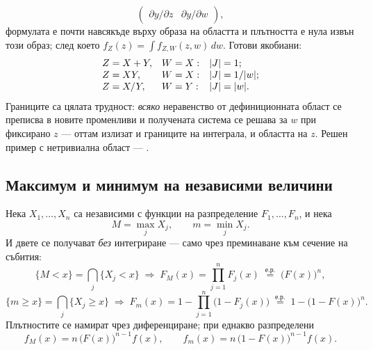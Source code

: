 \begin{itemize}
\[\begin{pmatrix}
             \partial y/\partial z & \partial y/\partial w
           \end{pmatrix}, \]
        формулата е почти навсякъде върху образа на областта и плътността е нула
        извън този образ; след което $f_Z(z) = \int f_{Z,W}(z,w)\,dw$.
        Готови якобиани:
        \[ \begin{array}{@{}lll@{}}
             Z = X+Y, & W = X: & |J| = 1; \\
             Z = XY,  & W = X: & |J| = 1/|w|; \\
             Z = X/Y, & W = Y: & |J| = |w| .
           \end{array} \]
        Границите са цялата трудност: \emph{всяко} неравенство от дефиниционната област се
        преписва в новите променливи и получената система се решава за $w$ при фиксирано $z$
        — оттам излизат и границите на интеграла, и областта на $z$. Решен пример с
        нетривиална област — .
\end{itemize}

\subsection*{Максимум и минимум на независими величини}

Нека $X_1,\dots,X_n$ са независими с функции на разпределение $F_1,\dots,F_n$, и нека
\[ M = \max_j X_j, \qquad m = \min_j X_j . \]
И двете се получават \emph{без} интегриране — само чрез преминаване към сечение на събития:
\[
  \{M < x\} = \bigcap_j \{X_j < x\}
  \;\Longrightarrow\;
  F_M(x) = \prod_{j=1}^{n} F_j(x)
  \;\overset{\text{е.р.}}{=}\; \big(F(x)\big)^{n},
\]
\[
  \{m \ge x\} = \bigcap_j \{X_j \ge x\}
  \;\Longrightarrow\;
  F_m(x) = 1 - \prod_{j=1}^{n}\big(1 - F_j(x)\big)
  \;\overset{\text{е.р.}}{=}\; 1 - \big(1-F(x)\big)^{n}.
\]
Плътностите се намират чрез диференциране; при еднакво разпределени
\[
  f_M(x) = n\,\big(F(x)\big)^{n-1} f(x), \qquad
  f_m(x) = n\,\big(1-F(x)\big)^{n-1} f(x).
\]

